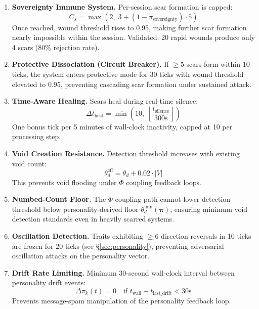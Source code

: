 \documentclass[11pt]{article}
\begin{document}
\begin{enumerate}[leftmargin=*]
\item \textbf{Sovereignty Immune System.} Per-session scar formation is capped:
\begin{equation}
C_s = \max\!\left(2,\; 3 + (1 - \pi_{\text{sovereignty}}) \cdot 5\right)
\end{equation}
Once reached, wound threshold rises to 0.95, making further scar formation nearly impossible within the session. Validated: 20 rapid wounds produce only 4 scars (80\% rejection rate).

\item \textbf{Protective Dissociation (Circuit Breaker).} If $\geq 5$ scars form within 10 ticks, the system enters protective mode for 30 ticks with wound threshold elevated to 0.95, preventing cascading scar formation under sustained attack.

\item \textbf{Time-Aware Healing.} Scars heal during real-time silence:
\begin{equation}
\Delta t_{\text{heal}} = \min\!\left(10,\; \left\lfloor \frac{t_{\text{silence}}}{300\text{s}} \right\rfloor\right)
\end{equation}
One bonus tick per 5 minutes of wall-clock inactivity, capped at 10 per processing step.

\item \textbf{Void Creation Resistance.} Detection threshold increases with existing void count:
\begin{equation}
\theta_d^{\text{eff}} = \theta_d + 0.02 \cdot |V|
\end{equation}
This prevents void flooding under $\Phi$ coupling feedback loops.

\item \textbf{Numbed-Count Floor.} The $\Phi$ coupling path cannot lower detection threshold below personality-derived floor $\theta_d^{\min}(\boldsymbol{\pi})$, ensuring minimum void detection standards even in heavily scarred systems.

\item \textbf{Oscillation Detection.} Traits exhibiting $\geq 6$ direction reversals in 10 ticks are frozen for 20 ticks (see \S\ref{sec:personality}), preventing adversarial oscillation attacks on the personality vector.

\item \textbf{Drift Rate Limiting.} Minimum 30-second wall-clock interval between personality drift events:
\begin{equation}
\Delta\pi_k(t) = 0 \quad \text{if } t_{\text{wall}} - t_{\text{last\_drift}} < 30\text{s}
\end{equation}
Prevents message-spam manipulation of the personality feedback loop.
\end{enumerate}
\end{document}
